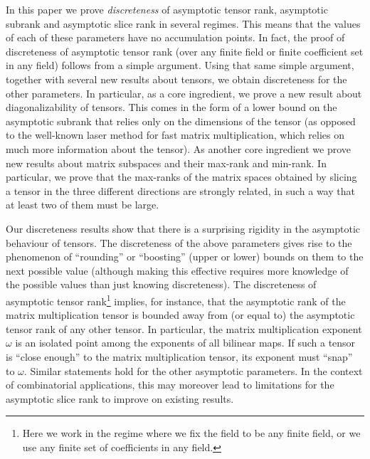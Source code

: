 \documentclass{daj}
\begin{document}
In this paper we prove \emph{discreteness} of asymptotic tensor rank, asymptotic subrank and asymptotic slice rank in several regimes. This means that the values of each of these parameters have no accumulation points.
In fact, the proof of discreteness of asymptotic tensor rank (over any finite field or finite coefficient set in any field) follows from a simple argument. Using that same simple argument, together with several new results about tensors, we obtain discreteness for the other parameters. 
In particular, as a core ingredient, we prove a new result about diagonalizability of tensors. This comes in the form of a lower bound on the asymptotic subrank that relies only on the dimensions of the tensor (as opposed to the well-known laser method for fast matrix multiplication, which relies on much more information about the tensor). As another core ingredient we prove new results about matrix subspaces and their max-rank and min-rank. In particular, we prove that the max-ranks of the matrix spaces obtained by slicing a tensor in the three different directions are strongly related, in such a way that at least two of them must be large.

Our discreteness results show that there is a surprising rigidity in the asymptotic behaviour of tensors.
The discreteness of the above parameters gives rise to the phenomenon of ``rounding'' or ``boosting'' (upper or lower) bounds on them to the next possible value (although making this effective requires more knowledge of the possible values than just knowing discreteness). %
The discreteness of asymptotic tensor rank\footnote{Here we work in the regime where we fix the field to be any finite field, or we use any finite set of coefficients in any field.} implies, for instance, that the asymptotic rank of the matrix multiplication tensor is bounded away from (or equal to) the asymptotic tensor rank of any other tensor. In particular, the matrix multiplication exponent $\omega$ is an isolated point among the exponents of all bilinear maps.
If such a tensor is ``close enough'' to the matrix multiplication tensor, its exponent must ``snap'' to $\omega$. Similar statements hold for the other asymptotic parameters. In the context of combinatorial applications, this may moreover lead to limitations for the asymptotic slice rank to improve on existing results.
\end{document}
